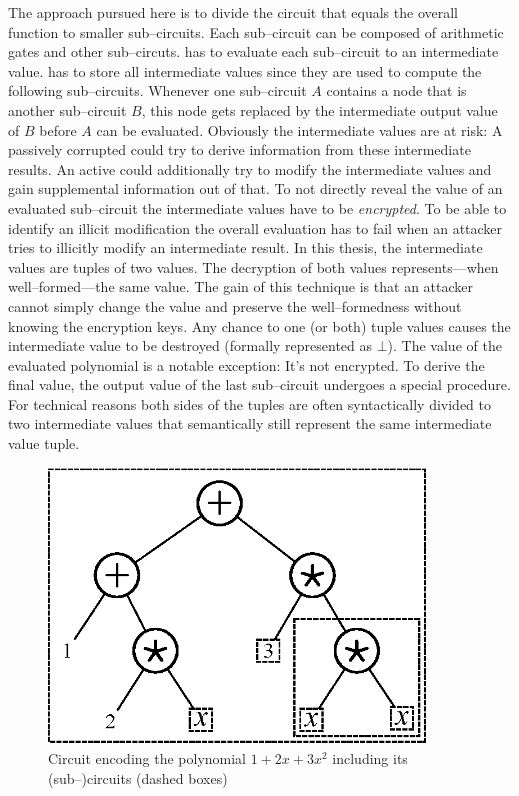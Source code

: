 The approach pursued here is to divide the circuit that equals the overall
function to smaller sub--circuits. Each sub--circuit can be composed of
arithmetic gates and other sub--circuts. \JWpTwo{} has to evaluate each
sub--circuit to an intermediate value. \JWpTwo{} has to store all
intermediate values since they are used to compute the following sub--circuits.
Whenever one sub--circuit $A$ contains a node that is another sub--circuit $B$,
this node gets replaced by the intermediate output value of $B$ before $A$ can
be evaluated. Obviously the intermediate values are at risk: A passively
corrupted \JWpTwo{} could try to derive information from these intermediate
results. An active \JWpTwo{} could additionally try to modify the intermediate
values and gain supplemental information out of that. To not directly reveal the
value of an evaluated sub--circuit the intermediate values have to be
\emph{encrypted}. To be able to identify an illicit modification the overall
evaluation has to fail when an attacker tries to illicitly modify an
intermediate result. In this thesis, the intermediate values are tuples of two
values. The decryption of both values represents---when well--formed---the same
value. The gain of this technique is that an attacker cannot simply change the
value and preserve the well--formedness without knowing the encryption keys. Any
chance to one (or both) tuple values causes the intermediate value to be
destroyed (formally represented as $\bot$). The value of the evaluated
polynomial is a notable exception: It's not encrypted. To derive the final
value, the output value of the last sub--circuit undergoes a special procedure.
For technical reasons both sides of the tuples are often syntactically divided
to two intermediate values that semantically still represent the same
intermediate value tuple.

\begin{figure}[htb]
  \centering
  \includegraphics[width=10cm]{images/sample-polynomial.eps}
  \caption{Circuit encoding the polynomial $1 + 2x + 3x^2$ including its
    (sub--)circuits (dashed boxes)}
  \label{fig:sample-poly}
\end{figure}

